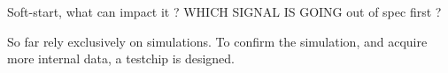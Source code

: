Soft-start, what can impact it ?
WHICH SIGNAL IS GOING out of spec first ?

So far rely exclusively on simulations.
To confirm the simulation, and acquire more internal data, a testchip is designed.
